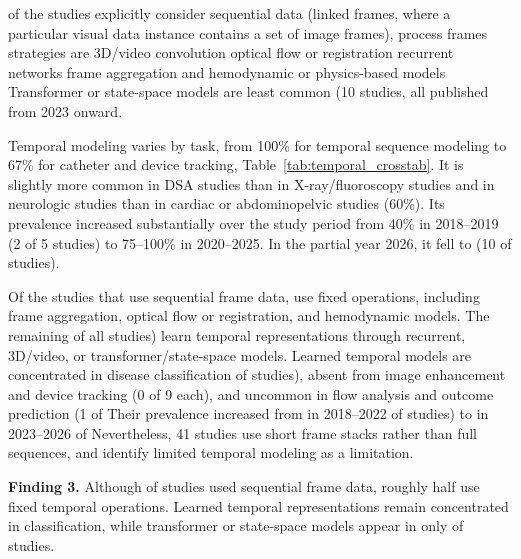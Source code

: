  of the  studies  explicitly consider sequential data (linked frames, where a particular visual data instance contains a set of image frames),   process frames   strategies are 3D/video convolution  optical flow or registration   recurrent networks  frame aggregation  and hemodynamic or physics-based models  Transformer or state-space models are least common (10 studies,  all published from 2023 onward. 

Temporal modeling varies by task, from 100\% for temporal sequence modeling  to 67\% for catheter and device tracking, Table~\ref{tab:temporal_crosstab}. It is slightly more common in DSA studies  than in X-ray/fluoroscopy studies  and in neurologic studies  than in cardiac  or abdominopelvic studies (60\%). Its prevalence increased substantially over the study period from 40\% in 2018--2019 (2 of 5 studies) to 75--100\% in 2020--2025. In the partial year 2026, it fell to  (10 of  studies).


Of the  studies that use sequential frame data,  use fixed operations, including frame aggregation, optical flow or registration, and hemodynamic models. The remaining   of all studies) learn temporal representations through recurrent, 3D/video, or transformer/state-space models. Learned temporal models are concentrated in disease classification  of  studies), absent from image enhancement and device tracking (0 of 9 each), and uncommon in flow analysis  and outcome prediction (1 of  Their prevalence increased from  in 2018--2022  of  studies) to  in 2023--2026  of  Nevertheless, 41 studies  use short frame stacks rather than full sequences, and  identify limited temporal modeling as a limitation.

\vspace{0.25cm}
\begin{mdframed}[linewidth=0.5pt, linecolor=black, backgroundcolor=blue!10]
\textbf{Finding 3.} Although  of studies used sequential frame data, roughly half use fixed temporal operations. Learned temporal representations remain concentrated in classification, while transformer or state-space models appear in only  of studies.
\end{mdframed}
\vspace{0.25cm}

